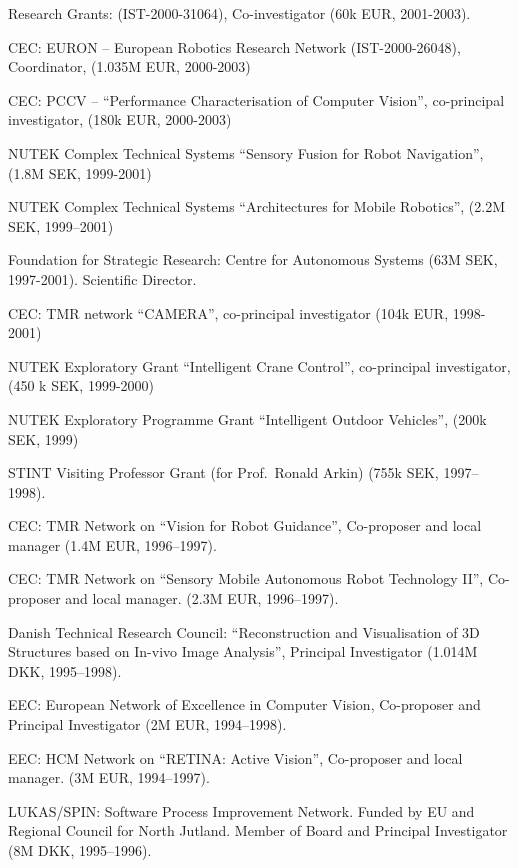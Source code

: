 \documentclass{article}
\begin{document}
\begin{cv}
\begin{cvlist}{Research Grants:}
  (IST-2000-31064), Co-investigator (60k EUR, 2001-2003).%
\item CEC: EURON -- European Robotics Research Network
  (IST-2000-26048), Coordinator, (1.035M EUR, 2000-2003)%
\item CEC: PCCV -- ``Performance Characterisation of Computer
  Vision'',  co-principal investigator, (180k EUR, 2000-2003)%
\item NUTEK Complex Technical Systems ``Sensory Fusion for Robot
  Navigation'', (1.8M SEK, 1999-2001)%
\item NUTEK Complex Technical Systems ``Architectures for Mobile
  Robotics'', (2.2M SEK, 1999--2001)%
\item Foundation for Strategic Research: Centre for Autonomous Systems
  (63M SEK, 1997-2001). Scientific Director.%
\item CEC: TMR network ``CAMERA'', co-principal investigator  (104k
  EUR, 1998-2001)%
\item NUTEK Exploratory Grant ``Intelligent Crane Control'',
  co-principal investigator, (450 k SEK, 1999-2000)%
\item NUTEK Exploratory Programme Grant ``Intelligent Outdoor
  Vehicles'', (200k SEK, 1999)%
\item STINT Visiting Professor Grant (for Prof.\ Ronald Arkin)  (755k
  SEK, 1997--1998).%
\item CEC: TMR Network on ``Vision for Robot Guidance'', Co-proposer
  and local manager (1.4M EUR, 1996--1997).%
\item CEC: TMR Network on ``Sensory Mobile Autonomous Robot Technology
  II'', Co-proposer and local manager.  (2.3M EUR, 1996--1997).%
\item Danish Technical Research Council: ``Reconstruction and
  Visualisation of 3D Structures based on In-vivo Image Analysis'',
  Principal Investigator (1.014M DKK, 1995--1998).%
\item EEC: European Network of Excellence in Computer Vision,
  Co-proposer and Principal Investigator (2M EUR, 1994--1998).%
\item EEC: HCM Network on ``RETINA: Active Vision'', Co-proposer and
  local manager.  (3M EUR, 1994--1997).%
\item LUKAS/SPIN: Software Process Improvement Network. Funded by EU
  and Regional Council for North Jutland. Member of Board and
  Principal Investigator (8M DKK, 1995--1996).%

\end{cvlist}
\end{cv}
\end{document}
